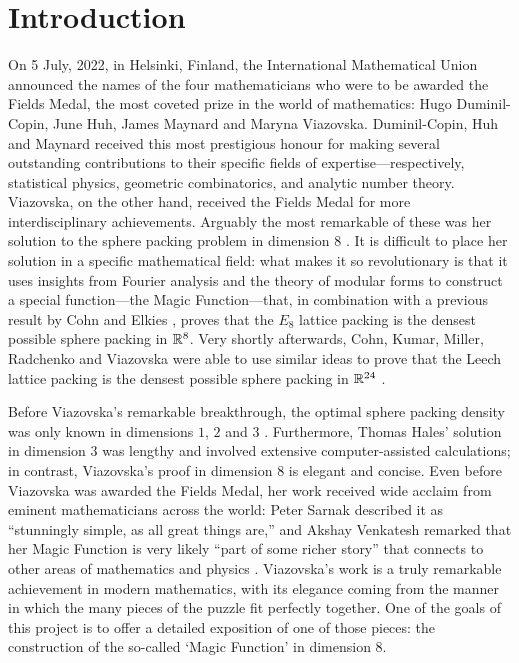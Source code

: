 \chapter{Introduction}
\thispagestyle{empty}

On 5 July, 2022, in Helsinki, Finland, the International Mathematical Union announced the names of the four mathematicians who were to be awarded the Fields Medal, the most coveted prize in the world of mathematics: Hugo Duminil-Copin, June Huh, James Maynard and Maryna Viazovska. Duminil-Copin, Huh and Maynard received this most prestigious honour for making several outstanding contributions to their specific fields of expertise---respectively, statistical physics, geometric combinatorics, and analytic number theory. Viazovska, on the other hand, received the Fields Medal for more interdisciplinary achievements. Arguably the most remarkable of these was her solution to the sphere packing problem in dimension 8 \cite{Viazovska8}. It is difficult to place her solution in a specific mathematical field: what makes it so revolutionary is that it uses insights from Fourier analysis and the theory of modular forms to construct a special function---the Magic Function---that, in combination with a previous result by Cohn and Elkies \cite{CohnElkies}, proves that the $E_8$ lattice packing is the densest possible sphere packing in $\mathbb{R}^8$. Very shortly afterwards, Cohn, Kumar, Miller, Radchenko and Viazovska were able to use similar ideas to prove that the Leech lattice packing is the densest possible sphere packing in $\mathbb{R}^{24}$ \cite{Viazovska24}.

Before Viazovska's remarkable breakthrough, the optimal sphere packing density was only known in dimensions $1$, $2$ and $3$ \cite{CohnOnViazovska}. Furthermore, Thomas Hales' solution in dimension $3$ \cite{HalesKeplerInformal} was lengthy and involved extensive computer-assisted calculations; in contrast, Viazovska's proof in dimension $8$ is elegant and concise. Even before Viazovska was awarded the Fields Medal, her work received wide acclaim from eminent mathematicians across the world: Peter Sarnak described it as ``stunningly simple, as all great things are,'' and Akshay Venkatesh remarked that her Magic Function is very likely ``part of some richer story'' that connects to other areas of mathematics and physics \cite{QuantaPiece}. Viazovska's work is a truly remarkable achievement in modern mathematics, with its elegance coming from the manner in which the many pieces of the puzzle fit perfectly together. One of the goals of this project is to offer a detailed exposition of one of those pieces: the construction of the so-called `Magic Function' in dimension $8$.






